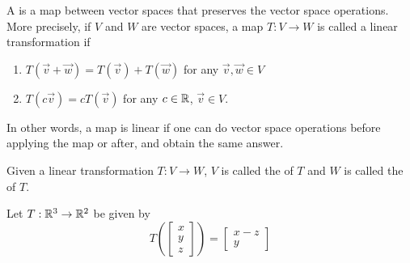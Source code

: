 
\begin{applicationActivities}{1}{17}

\begin{definition}
A  is a map between vector spaces that preserves the vector space operations.  More precisely, if $V$ and $W$ are vector spaces, a map $T:V\rightarrow W$ is called a linear transformation if
\begin{enumerate}
\item $T(\vec{v}+\vec{w}) = T(\vec{v})+T(\vec{w})$ for any $\vec{v},\vec{w} \in V$
\item $T(c\vec{v}) = cT(\vec{v})$ for any $c \in \mathbb{R}$, $\vec{v} \in V$.
\end{enumerate}
In other words, a map is linear if one can do vector space operations before applying the map or after, and obtain the same answer.
\end{definition}

\begin{definition}
Given a linear transformation \(T:V\to W\),
$V$ is called the  of $T$ and
$W$ is called the  of $T$.

\begin{center}
\end{center}
\end{definition}

\begin{example}
Let $T : \mathbb{R}^3 \rightarrow \mathbb{R}^2$ be given by $$T\left(\begin{bmatrix} x \\ y \\ z \end{bmatrix} \right) = \begin{bmatrix} x-z \\ y \end{bmatrix}$$


\end{example}
\end{applicationActivities}
